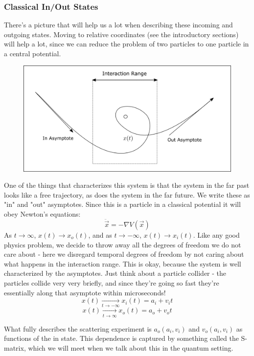 \documentclass{article}
\begin{document}
\subsubsection{Classical In/Out States}
There's a picture that will help us a lot when describing these incoming and outgoing states. Moving to relative coordinates (see the introductory sections) will help a lot, since we can reduce the problem of two particles to one particle in a central potential.
\begin{figure}[ht]
    \centering
    \includegraphics[width=\linewidth]{Figures/in_out_states.png}
    \caption*{}
    \label{fig:in_out_states}
\end{figure}
One of the things that characterizes this system is that the system in the far past looks like a free trajectory, as does the system in the far future. We write these as "in" and "out" asymptotes. Since this is a particle in a classical potential it will obey Newton's equations:
\begin{equation}\ddot{\vec{x}} = -\nabla V(\vec{x})\end{equation}
As $t \to \infty$, $x(t) \to x_o(t)$, and as $t \to -\infty$, $x(t)\to x_i(t)$. Like any good physics problem, we decide to throw away all the degrees of freedom we do not care about - here we disregard temporal degrees of freedom by not caring about what happens in the interaction range. This is okay, because the system is well characterized by the asymptotes. Just think about a particle collider - the particles collide very very briefly, and since they're going so fast they're essentially along that asymptote within microseconds!
\[x(t) \xrightarrow[t\to -\infty]{} x_i(t) = a_i + v_i t\]
\[x(t) \xrightarrow[t\to \infty]{} x_o(t) = a_o + v_o t\]

What fully describes the scattering experiment is $a_o(a_i,v_i)$ and $v_o(a_i,v_i)$ as functions of the in state. This dependence is captured by something called the S-matrix, which we will meet when we talk about this in the quantum setting.
\end{document}

